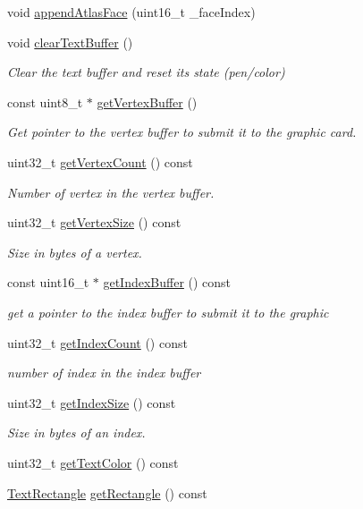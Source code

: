 \begin{DoxyCompactItemize}
\item 
void \hyperlink{class_text_buffer_afe90bba310c73d31b6b3e6439746fc02}{append\+Atlas\+Face} (uint16\+\_\+t \+\_\+face\+Index)
\item 
void \hyperlink{class_text_buffer_ac77de4fadc298d518a2ec439e223965f}{clear\+Text\+Buffer} ()
\begin{DoxyCompactList}\small\item\em Clear the text buffer and reset its state (pen/color) \end{DoxyCompactList}\item 
const uint8\+\_\+t $\ast$ \hyperlink{class_text_buffer_a62ef2f5ae57242c0d0842c7ab9c00b55}{get\+Vertex\+Buffer} ()
\begin{DoxyCompactList}\small\item\em Get pointer to the vertex buffer to submit it to the graphic card. \end{DoxyCompactList}\item 
uint32\+\_\+t \hyperlink{class_text_buffer_aea1cc32abd08bb2509eea3e0db12b80d}{get\+Vertex\+Count} () const 
\begin{DoxyCompactList}\small\item\em Number of vertex in the vertex buffer. \end{DoxyCompactList}\item 
uint32\+\_\+t \hyperlink{class_text_buffer_a8dbb2fb6d0ea25c9e7379ebf1c2afe0e}{get\+Vertex\+Size} () const 
\begin{DoxyCompactList}\small\item\em Size in bytes of a vertex. \end{DoxyCompactList}\item 
const uint16\+\_\+t $\ast$ \hyperlink{class_text_buffer_aa6fad402a64d9cc1e9691018a50e8c25}{get\+Index\+Buffer} () const 
\begin{DoxyCompactList}\small\item\em get a pointer to the index buffer to submit it to the graphic \end{DoxyCompactList}\item 
uint32\+\_\+t \hyperlink{class_text_buffer_a6a36c65b7c4f34b0dc576980e526740d}{get\+Index\+Count} () const 
\begin{DoxyCompactList}\small\item\em number of index in the index buffer \end{DoxyCompactList}\item 
uint32\+\_\+t \hyperlink{class_text_buffer_a5169f0886061c7f8d14fbd7577c74f6d}{get\+Index\+Size} () const 
\begin{DoxyCompactList}\small\item\em Size in bytes of an index. \end{DoxyCompactList}\item 
uint32\+\_\+t \hyperlink{class_text_buffer_a7d1e73ac8869940943a2a5f022e3c6f8}{get\+Text\+Color} () const 
\item 
\hyperlink{struct_text_rectangle}{Text\+Rectangle} \hyperlink{class_text_buffer_a833ebdaf3b4626fc27258e6c9c4a10e6}{get\+Rectangle} () const 
\end{DoxyCompactItemize}


